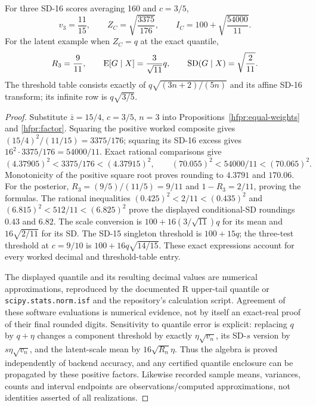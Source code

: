 \begin{proposition}
\label{hfpr:numerics}
For three SD-16 scores averaging 160 and \(c=3/5\),
\[
 v_3=\frac{11}{15},\qquad
 Z_C=\sqrt{\frac{3375}{176}},\qquad
 I_C=100+\sqrt{\frac{54000}{11}}.
\]
For the latent example when \(Z_C=q\) at the exact quantile,
\[
 R_3=\frac9{11},\qquad
 \operatorname{E}[G\mid X]=\frac3{\sqrt{11}}q,\qquad
 \operatorname{SD}(G\mid X)=\sqrt{\frac2{11}}.
\]
The threshold table consists exactly of \(q\sqrt{(3n+2)/(5n)}\)
and its affine SD-16 transform; its infinite row is \(q\sqrt{3/5}\).
\end{proposition}
\begin{proof}
Substitute \(\bar z=15/4\), \(c=3/5\), \(n=3\) into
Propositions~\ref{hfpr:equal-weights} and \ref{hfpr:factor}. Squaring
the positive worked composite gives
\((15/4)^2/(11/15)=3375/176\); squaring its SD-16 excess gives
\(16^2\cdot3375/176=54000/11\). Exact rational comparisons give
\[
 (4.37905)^2<3375/176<(4.37915)^2,\qquad
 (70.055)^2<54000/11<(70.065)^2.
\]
Monotonicity of the positive square root proves rounding to \(4.3791\)
and \(170.06\). For the posterior,
\(R_3=(9/5)/(11/5)=9/11\) and \(1-R_3=2/11\), proving the formulas.
The rational inequalities
\((0.425)^2<2/11<(0.435)^2\) and
\((6.815)^2<512/11<(6.825)^2\) prove the displayed conditional-SD
roundings \(0.43\) and \(6.82\).
The scale conversion is \(100+16(3/\sqrt{11})q\) for its mean and
\(16\sqrt{2/11}\) for its SD. The SD-15 singleton threshold is
\(100+15q\); the three-test threshold at \(c=9/10\) is
\(100+16q\sqrt{14/15}\). These exact expressions account for every
worked decimal and threshold-table entry.

The displayed quantile and its resulting decimal values are numerical
approximations, reproduced by the documented R upper-tail quantile or
\texttt{scipy.stats.norm.isf} and the repository's calculation script.
Agreement of these software evaluations is numerical evidence, not by
itself an exact-real proof of their final rounded digits. Sensitivity to
quantile error is explicit: replacing \(q\) by \(q+\eta\) changes a
component threshold by exactly \(\eta\sqrt{v_n}\), its SD-\(s\) version
by \(s\eta\sqrt{v_n}\), and the latent-scale mean by
\(16\sqrt{R_n}\eta\). Thus the algebra is proved independently of
backend accuracy, and any certified quantile enclosure can be propagated
by these positive factors. Likewise recorded sample means, variances,
counts and interval endpoints are observations/computed approximations,
not identities asserted of all realizations.
\end{proof}
